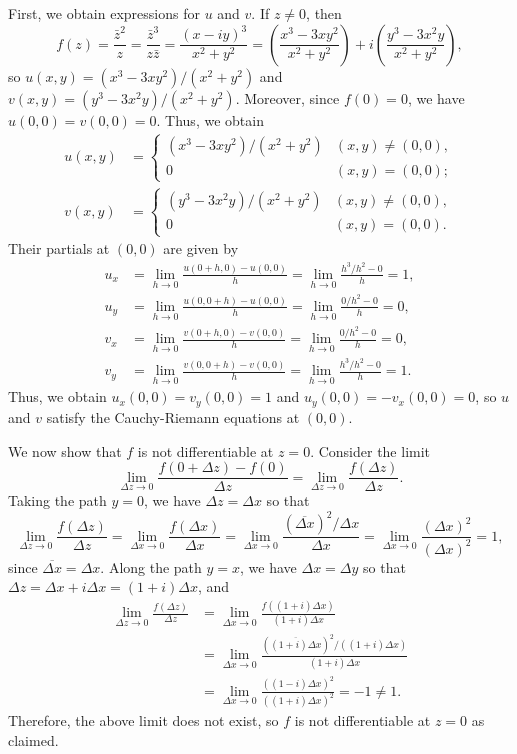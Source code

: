 \documentclass[10pt]{article}
\theoremstyle{newstyle}
\begin{document}
First, we obtain expressions for $u$ and $v$. If $z \neq 0$, then 
\[ f(z) = \frac{\bar{z}^2}{z} = \frac{\bar{z}^3}{z\bar{z}} = \frac{(x-iy)^3}{x^2+y^2} 
= \left( \frac{x^3 - 3xy^2}{x^2 + y^2} \right) + i \left( \frac{y^3 - 3x^2y}{x^2 + y^2} \right), \]
so $u(x, y) = (x^3 - 3xy^2)/(x^2 + y^2)$ and $v(x, y) = (y^3 - 3x^2y)/(x^2 + y^2)$. 
Moreover, since $f(0) = 0$, we have $u(0, 0) = v(0, 0) = 0$. Thus, we obtain 
\begin{align*}
    u(x, y) &= \begin{cases} (x^3 - 3xy^2)/(x^2 + y^2) & (x, y) \neq (0, 0), \\ 0 & (x, y) = (0, 0); 
    \end{cases} \\
    v(x, y) &= \begin{cases} (y^3 - 3x^2y)/(x^2 + y^2) & (x, y) \neq (0, 0), \\ 0 & (x, y) = (0, 0). 
    \end{cases}
\end{align*}
Their partials at $(0, 0)$ are given by 
\begin{align*}
    u_x &= \lim_{h\to0} \frac{u(0+h, 0) - u(0, 0)}h = \lim_{h\to0} \frac{h^3/h^2 - 0}h = 1, \\
    u_y &= \lim_{h\to0} \frac{u(0, 0+h) - u(0, 0)}h = \lim_{h\to0} \frac{0/h^2 - 0}h = 0, \\
    v_x &= \lim_{h\to0} \frac{v(0+h, 0) - v(0, 0)}h = \lim_{h\to0} \frac{0/h^2 - 0}h = 0, \\
    v_y &= \lim_{h\to0} \frac{v(0, 0+h) - v(0, 0)}h = \lim_{h\to0} \frac{h^3/h^2 - 0}h = 1.
\end{align*}
Thus, we obtain $u_x(0, 0) = v_y(0, 0) = 1$ and $u_y(0, 0) = -v_x(0, 0) = 0$, so $u$ and $v$ 
satisfy the Cauchy-Riemann equations at $(0, 0)$. 

We now show that $f$ is not differentiable at $z = 0$. Consider the limit 
\[ \lim_{\Delta z \to 0} \frac{f(0 + \Delta z) - f(0)}{\Delta z} = 
\lim_{\Delta z \to 0} \frac{f(\Delta z)}{\Delta z}. \]
Taking the path $y = 0$, we have $\Delta z = \Delta x$ so that 
\[ \lim_{\Delta z \to 0} \frac{f(\Delta z)}{\Delta z} = 
\lim_{\Delta x \to 0} \frac{f(\Delta x)}{\Delta x} = \lim_{\Delta x \to 0} 
\frac{(\overline{\Delta x})^2/\Delta x}{\Delta x} = 
\lim_{\Delta x \to 0} \frac{(\Delta x)^2}{(\Delta x)^2} = 1, \]
since $\overline{\Delta x} = \Delta x$. Along the path $y = x$, 
we have $\Delta x = \Delta y$ so that $\Delta z = \Delta x + i\Delta x = (1+i)\Delta x$, and 
\begin{align*}
    \lim_{\Delta z \to 0} \frac{f(\Delta z)}{\Delta z} 
    &= \lim_{\Delta x \to 0} \frac{f((1+i)\Delta x)}{(1+i)\Delta x} \\
    &= \lim_{\Delta x \to 0} \frac{(\overline{(1+i)\Delta x})^2 / ((1+i)\Delta x)}{(1+i)\Delta x} \\
    &= \lim_{\Delta x \to 0} \frac{((1-i)\Delta x)^2}{((1+i)\Delta x)^2} = -1 \neq 1.
\end{align*}
Therefore, the above limit does not exist, so $f$ is not differentiable at $z = 0$ as claimed. 
\end{document}

